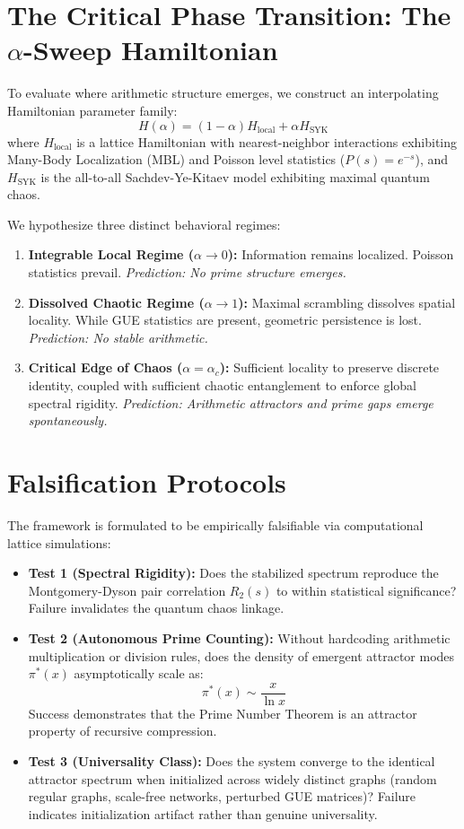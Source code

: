 \documentclass[11pt,a4paper]{article}
\begin{document}
\section{The Critical Phase Transition: The $\alpha$-Sweep Hamiltonian}
To evaluate where arithmetic structure emerges, we construct an interpolating Hamiltonian parameter family:
\begin{equation}
H(\alpha) = (1 - \alpha) H_{\text{local}} + \alpha H_{\text{SYK}}
\end{equation}
where $H_{\text{local}}$ is a lattice Hamiltonian with nearest-neighbor interactions exhibiting Many-Body Localization (MBL) and Poisson level statistics ($P(s) = e^{-s}$), and $H_{\text{SYK}}$ is the all-to-all Sachdev-Ye-Kitaev model \cite{maldacena2016remarks} exhibiting maximal quantum chaos.

We hypothesize three distinct behavioral regimes:
\begin{enumerate}
    \item \textbf{Integrable Local Regime ($\alpha \to 0$):} Information remains localized. Poisson statistics prevail. \textit{Prediction: No prime structure emerges.}
    \item \textbf{Dissolved Chaotic Regime ($\alpha \to 1$):} Maximal scrambling dissolves spatial locality. While GUE statistics are present, geometric persistence is lost. \textit{Prediction: No stable arithmetic.}
    \item \textbf{Critical Edge of Chaos ($\alpha = \alpha_c$):} Sufficient locality to preserve discrete identity, coupled with sufficient chaotic entanglement to enforce global spectral rigidity. \textit{Prediction: Arithmetic attractors and prime gaps emerge spontaneously.}
\end{enumerate}

\section{Falsification Protocols}
The framework is formulated to be empirically falsifiable via computational lattice simulations:
\begin{itemize}
    \item \textbf{Test 1 (Spectral Rigidity):} Does the stabilized spectrum reproduce the Montgomery-Dyson pair correlation $R_2(s)$ to within statistical significance? Failure invalidates the quantum chaos linkage.
    \item \textbf{Test 2 (Autonomous Prime Counting):} Without hardcoding arithmetic multiplication or division rules, does the density of emergent attractor modes $\pi^*(x)$ asymptotically scale as:
    \begin{equation}
    \pi^*(x) \sim \frac{x}{\ln x}
    \end{equation}
    Success demonstrates that the Prime Number Theorem is an attractor property of recursive compression.
    \item \textbf{Test 3 (Universality Class):} Does the system converge to the identical attractor spectrum when initialized across widely distinct graphs (random regular graphs, scale-free networks, perturbed GUE matrices)? Failure indicates initialization artifact rather than genuine universality.
\end{itemize}
\end{document}
